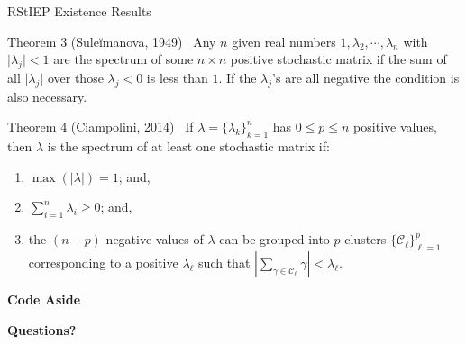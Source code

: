 \documentclass[handout]{beamer}
\newif\ifafterftpause
\begin{document}
\begin{frame}[t]{RStIEP Existence Results}

  \vspace{-15pt}

  \begin{titled-frame}{Theorem 3 (Sule\u{i}manova, 1949)~\cite{chuInverseEigenvalueProblems2005}}
    Any $n$ given real numbers $1, \lambda_2, \cdots, \lambda_n$ with $\vert \lambda_j \vert < 1$ are the spectrum of some $n \times n$ positive stochastic matrix if the sum of all $\vert \lambda_j \vert$ over those $\lambda_j < 0$ is less than $1$.
    If the $\lambda_j$'s are all negative the condition is also necessary.
  \end{titled-frame} \pause

  \begin{titled-frame}{Theorem 4 (Ciampolini, 2014)~\cite{ciampoliniDirectSolutionInverse2014}}
    If $\lambda = \{ \lambda_k \}_{k=1}^n$ has $0 \leq p \leq n$ positive values, then $\lambda$ is the spectrum of at least one stochastic matrix if:
    \begin{enumerate}
      \item $\max( \vert \lambda \vert ) = 1$; and,
      \item $\sum_{i=1}^n \lambda_i \geq 0$; and,
      \item the $(n-p)$ negative values of $\lambda$ can be grouped into $p$ clusters $\{ \mathcal{C}_\ell \}_{\ell=1}^{p}$ corresponding to a positive $\lambda_\ell$ such that $\left\vert \sum_{\gamma \in \mathcal{C}_\ell} \gamma \right\vert < \lambda_\ell$.
    \end{enumerate}
  \end{titled-frame} \pause


\end{frame}

{
  \afterftpausefalse

\begin{frame}
  \textbf{Code Aside}
\end{frame}

}

{
  \afterftpausefalse

\begin{frame}
  \textbf{Questions?}
\end{frame}

}
\end{document}
